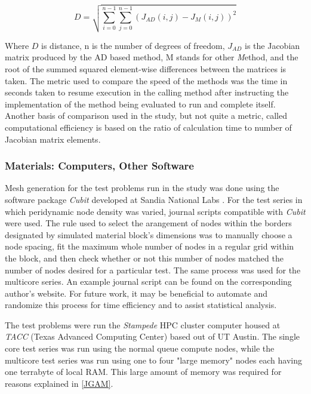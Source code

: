 \documentclass[preprint,12pt]{elsarticle}
\begin{document}
\begin{equation} D = \sqrt{\sum_{i=0}^{n-1}\sum_{j=0}^{n-1} (J_{AD}(i,j) - J_{M}(i,j))^2}
\end{equation}

Where $D$ is distance, n is the number of degrees of freedom, $J_{AD}$ is the Jacobian matrix
produced by the AD based method, M stands for other \emph{M}ethod, and the root of the summed
squared element-wise differences between the matrices is taken.  The metric used to compare the
speed of the methods was the time in seconds taken to resume execution in the calling method after
instructing the implementation of the method being evaluated to run and complete itself. Another
basis of comparison used in the study, but not quite a metric, called computational efficiency is
based on the ratio of calculation time to number of Jacobian matrix elements.

\subsubsection{Materials: Computers, Other Software} 

Mesh generation for the test problems run in the study was done using the software package
\emph{Cubit} developed at Sandia National Labs \cite{ref-Cubit}. For the test series in which peridynamic node density was
varied, journal scripts compatible with \emph{Cubit} were used. The rule used to select the
arangement of nodes within the borders designated by simulated material block's dimensions was to
manually choose a node spacing, fit the maximum whole number of nodes in a regular grid within the
block, and then check whether or not this number of nodes matched the number of nodes desired for a
particular test. The same process was used for the multicore series. An example journal script can
be found on the corresponding author's website. For future work, it may be beneficial to automate
and randomize this process for time efficiency and to assist statistical analysis. 

The test problems were run the \emph{Stampede} HPC cluster computer housed at \emph{TACC} (Texas
Advanced Computing Center) based out of UT Austin. The single core test series was run using the
normal queue compute nodes, while the multicore test series was run using one to four "large memory"
nodes each having one terrabyte of local RAM. This large amount of memory was required for reasons
explained in \ref{JGAM}.  
\end{document}
